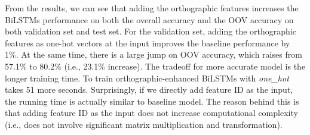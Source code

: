 \documentclass[11pt,letterpaper]{article}
\begin{document}

From the results, we can see that adding the orthographic features increases the BiLSTMs performance on
both the overall accuracy and the OOV accuracy on both validation set and test set. For the validation set,
adding the orthographic features as one-hot vectors at the input improves the baseline performance by 1\%. At the same time,
there is a large jump on OOV accuracy, which raises from 57.1\% to 80.2\% (i.e., 23.1\% increase). The tradeoff
for more accurate model is the longer training time. To train orthographic-enhanced BiLSTMs with \emph{one\_hot}
takes 51 more seconds. Surprisingly, if we directly add feature ID as the input, the running time is actually
similar to baseline model. The reason behind this is that adding feature ID as the input does not increase computational
complexity (i.e., does not involve significant matrix multiplication and transformation).
\end{document}
